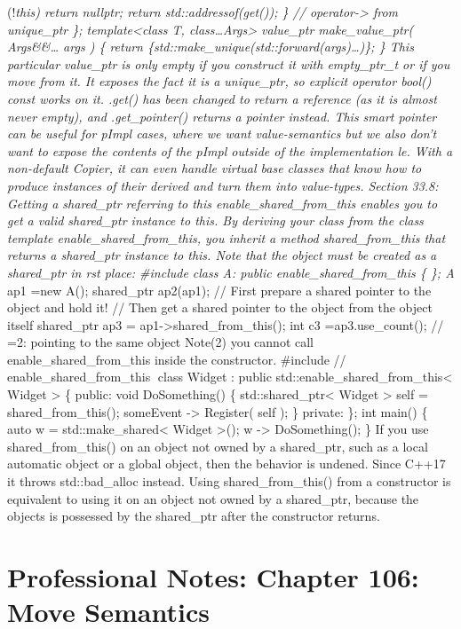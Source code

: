 (!\emph{this) return nullptr; return std::addressof(get()); \} //
operator-\textgreater{} from unique\_ptr \}; template\textless class T,
class\ldots Args\textgreater{} value\_ptr make\_value\_ptr(
Args\&\&\ldots{} args ) \{ return
\{std::make\_unique(std::forward(args)\ldots)\}; \} This particular
value\_ptr is only empty if you construct it with empty\_ptr\_t or if
you move from it. It exposes the fact it is a unique\_ptr, so explicit
operator bool() const works on it. .get() has been changed to return a
reference (as it is almost never empty), and .get\_pointer() returns a
pointer instead. This smart pointer can be useful for pImpl cases, where
we want value-semantics but we also don't want to expose the contents of
the pImpl outside of the implementation le. With a non-default Copier,
it can even handle virtual base classes that know how to produce
instances of their derived and turn them into value-types. Section 33.8:
Getting a shared\_ptr referring to this enable\_shared\_from\_this
enables you to get a valid shared\_ptr instance to this. By deriving
your class from the class template enable\_shared\_from\_this, you
inherit a method shared\_from\_this that returns a shared\_ptr instance
to this. Note that the object must be created as a shared\_ptr in rst
place: \#include class A: public enable\_shared\_from\_this \{ \}; A}
ap1 =new A(); shared\_ptr ap2(ap1); // First prepare a shared pointer to
the object and hold it! // Then get a shared pointer to the object from
the object itself shared\_ptr ap3 =
ap1-\textgreater shared\_from\_this(); int c3 =ap3.use\_count(); // =2:
pointing to the same object Note(2) you cannot call
enable\_shared\_from\_this inside the constructor. \#include //
enable\_shared\_from\_this class Widget : public
std::enable\_shared\_from\_this\textless{} Widget \textgreater{} \{
public: void DoSomething() \{ std::shared\_ptr\textless{} Widget
\textgreater{} self = shared\_from\_this(); someEvent -\textgreater{}
Register( self ); \} private: \}; int main() \{ auto w =
std::make\_shared\textless{} Widget \textgreater(); w -\textgreater{}
DoSomething(); \} If you use shared\_from\_this() on an object not owned
by a shared\_ptr, such as a local automatic object or a global object,
then the behavior is undened. Since C++17 it throws std::bad\_alloc
instead. Using shared\_from\_this() from a constructor is equivalent to
using it on an object not owned by a shared\_ptr, because the objects is
possessed by the shared\_ptr after the constructor returns.

\hypertarget{professional-notes-chapter-106-move-semantics-1}{%
\chapter{Professional Notes: Chapter 106: Move
Semantics}\label{professional-notes-chapter-106-move-semantics-1}}

